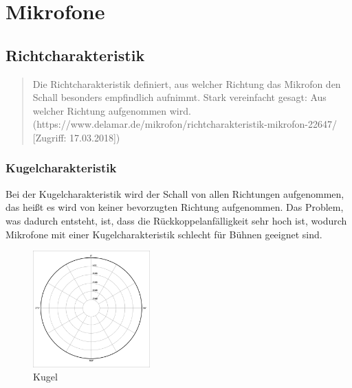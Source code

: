 \section{Mikrofone}
\subsection{Richtcharakteristik}
\begin{quote}
Die Richtcharakteristik definiert, aus welcher Richtung das Mikrofon den Schall besonders empfindlich aufnimmt. Stark vereinfacht gesagt: Aus welcher Richtung aufgenommen wird. (https://www.delamar.de/mikrofon/richtcharakteristik-mikrofon-22647/ [Zugriff: 17.03.2018])
\end{quote}
\subsubsection{Kugelcharakteristik}
Bei der Kugelcharakteristik wird der Schall von allen Richtungen aufgenommen, das heißt es wird von keiner bevorzugten Richtung aufgenommen. Das Problem, was dadurch entsteht, ist, dass die Rückkoppelanfälligkeit sehr hoch ist, wodurch Mikrofone mit einer Kugelcharakteristik schlecht für Bühnen geeignet sind.\citep{kugel}
\begin{figure}[H]
	\centering
	\includegraphics[width=0.4\textwidth]{abb4} 
	\caption[Kugel]{Kugel\footnotemark}
\end{figure}
